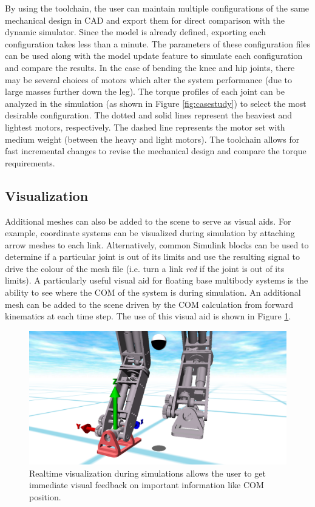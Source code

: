 By using the toolchain, the user can maintain multiple configurations of the same mechanical design in CAD and export them for direct comparison with the dynamic simulator. Since the model is already defined, exporting each configuration takes less than a minute. The parameters of these configuration files can be used along with the model update feature to simulate each configuration and compare the results. In the case of bending the knee and hip joints, there may be several choices of motors which alter the system performance (due to large masses further down the leg). The torque profiles of each joint can be analyzed in the simulation (as shown in Figure \ref{fig:casestudy}) to select the most desirable configuration. The dotted and solid lines represent the heaviest and lightest motors, respectively. The dashed line represents the motor set with medium weight (between the heavy and light motors). The toolchain allows for fast incremental changes to revise the mechanical design and compare the torque requirements. 


\subsection{Visualization} %
\label{sub:visualization}
Additional meshes can also be added to the scene to serve as visual aids. For example, coordinate systems can be visualized during simulation by attaching arrow meshes to each link. Alternatively, common Simulink blocks can be used to determine if a particular joint is out of its limits and use the resulting signal to drive the colour of the mesh file (i.e. turn a link \emph{red} if the joint is out of its limits). A particularly useful visual aid for floating base multibody systems is the ability to see where the COM of the system is during simulation.  An additional mesh can be added to the scene driven by the COM calculation from forward kinematics at each time step. The use of this visual aid is shown in Figure  \ref{fig:visualcom}.

\begin{figure}[!h]
	\centering
    \includegraphics[scale=0.40]{fig/toolchain/visualizecom.png}
  	\caption{Realtime visualization during simulations allows the user to get immediate visual feedback on important information like COM position.}
	\label{fig:visualcom}
\end{figure}

